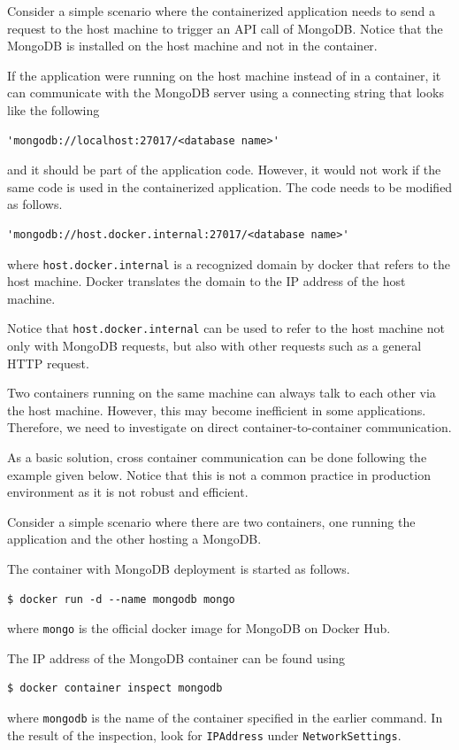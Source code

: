 Consider a simple scenario where the containerized application needs to send a request to the host machine to trigger an API call of MongoDB. Notice that the MongoDB is installed on the host machine and not in the container.

If the application were running on the host machine instead of in a container, it can communicate with the MongoDB server using a connecting string that looks like the following
\begin{lstlisting}
'mongodb://localhost:27017/<database name>'	
\end{lstlisting}
and it should be part of the application code. However, it would not work if the same code is used in the containerized application. The code needs to be modified as follows.
\begin{lstlisting}
'mongodb://host.docker.internal:27017/<database name>'	
\end{lstlisting}
where \verb|host.docker.internal| is a recognized domain by docker that refers to the host machine. Docker translates the domain to the IP address of the host machine.

Notice that \verb|host.docker.internal| can be used to refer to the host machine not only with MongoDB requests, but also with other requests such as a general HTTP request.

Two containers running on the same machine can always talk to each other via the host machine. However, this may become inefficient in some applications. Therefore, we need to investigate on direct container-to-container communication.

As a basic solution, cross container communication can be done following the example given below. Notice that this is not a common practice in production environment as it is not robust and efficient.

Consider a simple scenario where there are two containers, one running the application and the other hosting a MongoDB. 

The container with MongoDB deployment is started as follows.
\begin{lstlisting}
$ docker run -d --name mongodb mongo 	
\end{lstlisting}
where \verb|mongo| is the official docker image for MongoDB on Docker Hub.

The IP address of the MongoDB container can be found using
\begin{lstlisting}
$ docker container inspect mongodb	
\end{lstlisting}
where \verb|mongodb| is the name of the container specified in the earlier command. In the result of the inspection, look for \verb|IPAddress| under \verb|NetworkSettings|.


